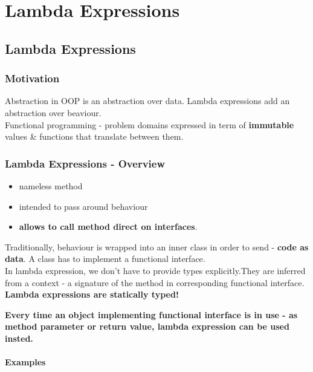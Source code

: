 \documentclass{report}
\begin{document}
\part{Lambda Expressions}
\chapter{Lambda Expressions}
\section{Motivation}
Abstraction in OOP is an abstraction over data. Lambda expressions add an abstraction over beaviour.\\
Functional programming - problem domains expressed in term of \textbf{immutable} values \& functions that translate between them. 

\section{Lambda Expressions - Overview}
\begin{itemize}
	\item nameless method
	\item intended to pass around behaviour
	\item \textbf{allows to call method direct on interfaces}.
\end{itemize}
Traditionally, behaviour is wrapped into an inner class in order to send - \textbf{code as data}. A class has to implement a functional interface.\\
In lambda expression, we don't have to provide types explicitly.They are inferred from a context - a signature of the method in corresponding functional interface.\\
\textbf{Lambda expressions are statically typed!}
\par \textbf{Every time an object implementing functional interface is in use - as method parameter or return value, lambda expression can be used insted.}

\subsection*{Examples}
\end{document}
